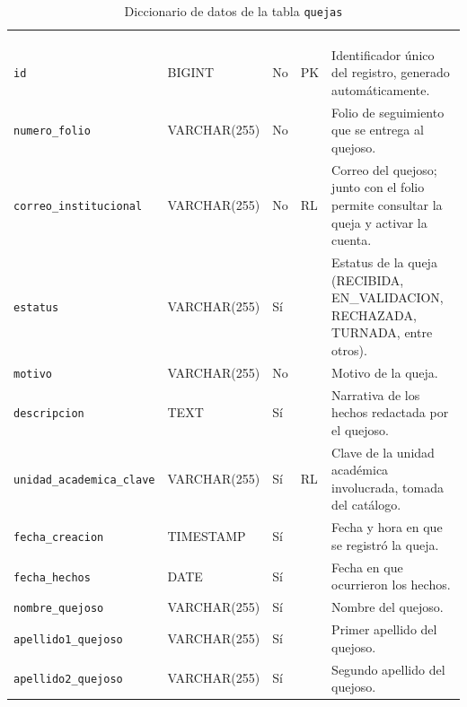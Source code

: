 \footnotesize
\renewcommand{\arraystretch}{1.15}
\setlength{\tabcolsep}{4pt}
\begin{longtable}{|L{3.9cm}|L{2.4cm}|L{0.9cm}|L{1.2cm}|L{6.6cm}|}
	\hiderowcolors\caption{Diccionario de datos de la tabla \texttt{quejas}}
	\label{tab:cap3_dic_quejas} \\ \showrowcolors
	\hline
	 &  &  &  &  \\
	\hline
	\endfirsthead
	\hline
	 &  &  &  &  \\
	\hline
	\endhead
		\texttt{id} & BIGINT & No & PK & Identificador único del registro, generado automáticamente. \\ \hline
		\texttt{numero\_\allowbreak{}folio} & VARCHAR(255) & No &  & Folio de seguimiento que se entrega al quejoso. \\ \hline
		\texttt{correo\_\allowbreak{}institucional} & VARCHAR(255) & No & RL & Correo del quejoso; junto con el folio permite consultar la queja y activar la cuenta. \\ \hline
		\texttt{estatus} & VARCHAR(255) & Sí &  & Estatus de la queja (RECIBIDA, EN\_VALIDACION, RECHAZADA, TURNADA, entre otros). \\ \hline
		\texttt{motivo} & VARCHAR(255) & No &  & Motivo de la queja. \\ \hline
		\texttt{descripcion} & TEXT & Sí &  & Narrativa de los hechos redactada por el quejoso. \\ \hline
		\texttt{unidad\_\allowbreak{}academica\_\allowbreak{}clave} & VARCHAR(255) & Sí & RL & Clave de la unidad académica involucrada, tomada del catálogo. \\ \hline
		\texttt{fecha\_\allowbreak{}creacion} & TIMESTAMP & Sí &  & Fecha y hora en que se registró la queja. \\ \hline
		\texttt{fecha\_\allowbreak{}hechos} & DATE & Sí &  & Fecha en que ocurrieron los hechos. \\ \hline
		\texttt{nombre\_\allowbreak{}quejoso} & VARCHAR(255) & Sí &  & Nombre del quejoso. \\ \hline
		\texttt{apellido1\_\allowbreak{}quejoso} & VARCHAR(255) & Sí &  & Primer apellido del quejoso. \\ \hline
		\texttt{apellido2\_\allowbreak{}quejoso} & VARCHAR(255) & Sí &  & Segundo apellido del quejoso. \\ \hline

\end{longtable}
